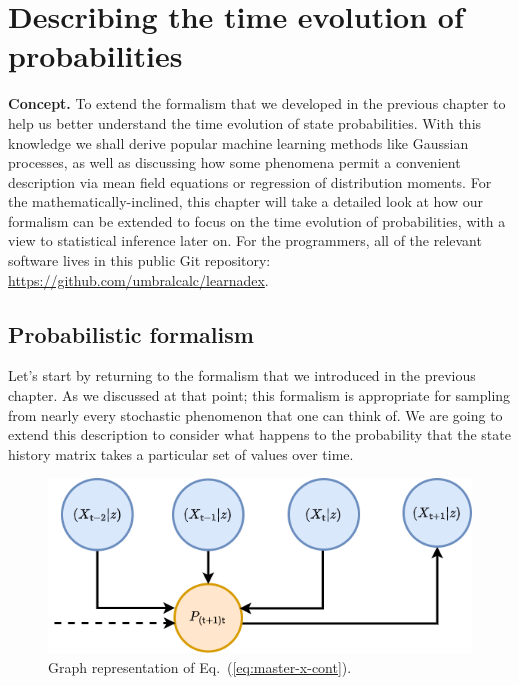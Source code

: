 \chapter{\sffamily Describing the time evolution of probabilities}

{\bfseries\sffamily Concept.} To extend the formalism that we developed in the previous chapter to help us better understand the time evolution of state probabilities. With this knowledge we shall derive popular machine learning methods like Gaussian processes, as well as discussing how some phenomena permit a convenient description via mean field equations or regression of distribution moments. For the mathematically-inclined, this chapter will take a detailed look at how our formalism can be extended to focus on the time evolution of probabilities, with a view to statistical inference later on. For the programmers, all of the relevant software lives in this public Git repository: \href{https://github.com/umbralcalc/learndadex}{https://github.com/umbralcalc/learnadex}.

\section{\sffamily Probabilistic formalism}

Let's start by returning to the formalism that we introduced in the previous chapter. As we discussed at that point; this formalism is appropriate for sampling from nearly every stochastic phenomenon that one can think of. We are going to extend this description to consider what happens to the probability that the state history matrix takes a particular set of values over time.

\begin{figure}[h]
\centering
\includegraphics[width=12cm]{images/chapter-2-master-eq-graph.drawio.png}
\caption{Graph representation of Eq.~(\ref{eq:master-x-cont}).}
\label{fig:master-eqn}
\end{figure} 

